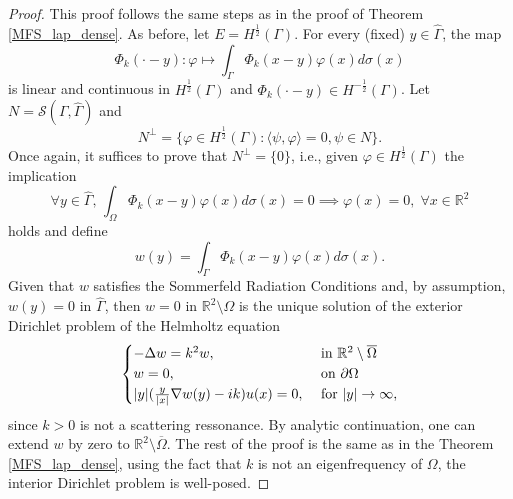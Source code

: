 \begin{proof}
    This proof follows the same steps as in the proof of Theorem \ref{MFS_lap_dense}. As before, let \(E = H^\frac{1}{2}(\Gamma)\). For every (fixed) \(y \in \hat{\Gamma}\), the map
    \[
        \Phi_k(\cdot-y): \varphi \mapsto \int_\Gamma \Phi_k(x-y)\varphi(x)d\sigma(x)
    \]
    is linear and continuous in \(H^\frac{1}{2}(\Gamma)\) and \(\Phi_k(\cdot-y) \in H^{-\frac{1}{2}}(\Gamma)\). Let \(N = \mathcal{S}(\Gamma, \hat{\Gamma})\) and
    \[
        N^\perp = \{\varphi \in H^\frac{1}{2}(\Gamma): \langle \psi, \varphi \rangle = 0, \psi \in N\}.
    \]
    Once again, it suffices to prove that \(N^\perp = \{0\}\), i.e., given \(\varphi \in H^\frac{1}{2}(\Gamma)\) the implication
    \[
        \forall y \in \hat{\Gamma}, \, \int_\Omega \Phi_k(x-y)\varphi(x)d\sigma(x) = 0 \implies \varphi(x) = 0, \; \forall x \in \mathbb{R}^2
    \]
    holds and define
    \[
        w(y) = \int_\Gamma \Phi_k(x-y)\varphi(x)d\sigma(x).
    \]
    Given that \(w\) satisfies the Sommerfeld Radiation Conditions and, by assumption, \(w(y) = 0\) in \(\hat{\Gamma}\), then \(w = 0\) in \(\mathbb{R}^2\setminus\Omega\) is the unique solution of the exterior Dirichlet problem of the Helmholtz equation
    \[
        \begin{cases}
            -\Delta w = k^2 w, & \text{ in } \mathbb{R}^2\setminus \overline{\Omega}\\
            w = 0, & \text{ on } \partial \Omega\\
            \abs{y} (\frac{y}{\abs{x}}\nabla w(y) - i k)u(x) = 0, & \text{ for } \abs{y} \rightarrow \infty,
        \end{cases}
    \]
    since \(k > 0\) is not a scattering ressonance. By analytic continuation, one can extend \(w\) by zero to \(\mathbb{R}^2\setminus \overline{\Omega}\). The rest of the proof is the same as in the Theorem \ref{MFS_lap_dense}, using the fact that \(k\) is not an eigenfrequency of \(\Omega\), the interior Dirichlet problem is well-posed.
\end{proof}
